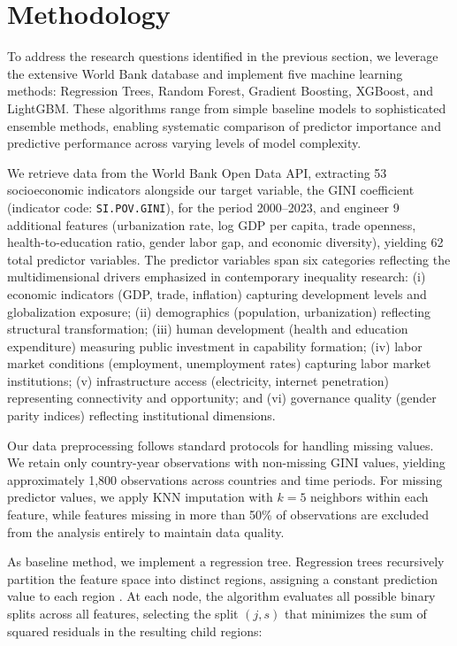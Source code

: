 \documentclass[10pt,twocolumn]{article}
\begin{document}
\section{Methodology}\label{sec:methodology}
\par To address the research questions identified in the previous section, we leverage the extensive World Bank database and implement five machine learning methods: Regression Trees, Random Forest, Gradient Boosting, XGBoost, and LightGBM. These algorithms range from simple baseline models to sophisticated ensemble methods, enabling systematic comparison of predictor importance and predictive performance across varying levels of model complexity.
\par We retrieve data from the World Bank Open Data API, extracting 53 socioeconomic indicators alongside our target variable, the GINI coefficient (indicator code: \texttt{SI.POV.GINI}), for the period 2000--2023, and engineer 9 additional features (urbanization rate, log GDP per capita, trade openness, health-to-education ratio, gender labor gap, and economic diversity), yielding 62 total predictor variables. The predictor variables span six categories reflecting the multidimensional drivers emphasized in contemporary inequality research: (i) economic indicators (GDP, trade, inflation) capturing development levels and globalization exposure; (ii) demographics (population, urbanization) reflecting structural transformation; (iii) human development (health and education expenditure) measuring public investment in capability formation; (iv) labor market conditions (employment, unemployment rates) capturing labor market institutions; (v) infrastructure access (electricity, internet penetration) representing connectivity and opportunity; and (vi) governance quality (gender parity indices) reflecting institutional dimensions.
\par Our data preprocessing follows standard protocols for handling missing values. We retain only country-year observations with non-missing GINI values, yielding approximately 1,800 observations across countries and time periods. For missing predictor values, we apply KNN imputation with $k=5$ neighbors within each feature, while features missing in more than 50\% of observations are excluded from the analysis entirely to maintain data quality. 
\par As baseline method, we implement a regression tree. Regression trees recursively partition the feature space into distinct regions, assigning a constant prediction value to each region \cite{breiman1984classification}. At each node, the algorithm evaluates all possible binary splits across all features, selecting the split $(j, s)$ that minimizes the sum of squared residuals in the resulting child regions:
\end{document}

